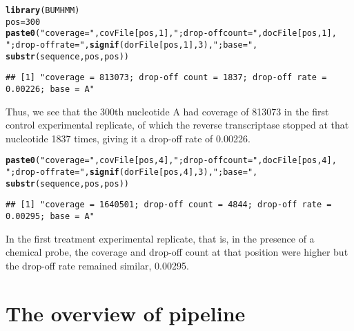 \documentclass{article}\usepackage[]{graphicx}\usepackage[]{color}
\makeatletter
\newcommand{\hlnum}[1]{\textcolor[rgb]{0.686,0.059,0.569}{#1}}%
\newcommand{\hlstr}[1]{\textcolor[rgb]{0.192,0.494,0.8}{#1}}%
\newcommand{\hlstd}[1]{\textcolor[rgb]{0.345,0.345,0.345}{#1}}%
\newcommand{\hlkwb}[1]{\textcolor[rgb]{0.69,0.353,0.396}{#1}}%
\newcommand{\hlkwd}[1]{\textcolor[rgb]{0.737,0.353,0.396}{\textbf{#1}}}%
\newenvironment{kframe}{%
 \def\at@end@of@kframe{}%
 \ifinner\ifhmode%
  \def\at@end@of@kframe{\end{minipage}}%
  \begin{minipage}{\columnwidth}%
 \fi\fi%
 \def\FrameCommand##1{\hskip\@totalleftmargin \hskip-\fboxsep
 \colorbox{shadecolor}{##1}\hskip-\fboxsep
     \hskip-\linewidth \hskip-\@totalleftmargin \hskip\columnwidth}%
 \MakeFramed {\advance\hsize-\width
   \@totalleftmargin\z@ \linewidth\hsize
   \@setminipage}}%
 {\par\unskip\endMakeFramed%
 \at@end@of@kframe}
\newenvironment{knitrout}{}{} %
\makeatother
\begin{document}
\begin{knitrout}
\color{fgcolor}\begin{kframe}
\begin{alltt}
\hlkwd{library}\hlstd{(BUMHMM)}
\hlstd{pos} \hlkwb{=} \hlnum{300}
\hlkwd{paste0}\hlstd{(}\hlstr{"coverage = "}\hlstd{, covFile[pos,} \hlnum{1}\hlstd{],} \hlstr{"; drop-off count = "}\hlstd{, docFile[pos,} \hlnum{1}\hlstd{],}
       \hlstr{"; drop-off rate = "}\hlstd{,} \hlkwd{signif}\hlstd{(dorFile[pos,} \hlnum{1}\hlstd{],} \hlnum{3}\hlstd{),} \hlstr{"; base = "}\hlstd{,}
       \hlkwd{substr}\hlstd{(sequence, pos, pos))}
\end{alltt}
\begin{verbatim}
## [1] "coverage = 813073; drop-off count = 1837; drop-off rate = 0.00226; base = A"
\end{verbatim}
\end{kframe}
\end{knitrout}

Thus, we see that the 300th nucleotide
A had coverage of 813073 in
the first control experimental replicate, of which the reverse transcriptase
stopped at that nucleotide 1837 times, giving it a drop-off
rate of 0.00226.

\begin{knitrout}
\color{fgcolor}\begin{kframe}
\begin{alltt}
\hlkwd{paste0}\hlstd{(}\hlstr{"coverage = "}\hlstd{, covFile[pos,} \hlnum{4}\hlstd{],} \hlstr{"; drop-off count = "}\hlstd{, docFile[pos,} \hlnum{4}\hlstd{],}
       \hlstr{"; drop-off rate = "}\hlstd{,} \hlkwd{signif}\hlstd{(dorFile[pos,} \hlnum{4}\hlstd{],} \hlnum{3}\hlstd{),} \hlstr{"; base = "}\hlstd{,}
       \hlkwd{substr}\hlstd{(sequence, pos, pos))}
\end{alltt}
\begin{verbatim}
## [1] "coverage = 1640501; drop-off count = 4844; drop-off rate = 0.00295; base = A"
\end{verbatim}
\end{kframe}
\end{knitrout}

In the first treatment experimental replicate, that is, in the presence of a
chemical probe, the coverage and drop-off count at that position were higher but
the drop-off rate remained similar, 0.00295.

\section{The overview of pipeline}
\end{document}
